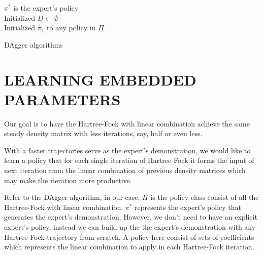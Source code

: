 \documentclass[twoside]{article}
\begin{document}
\begin{algorithm}[htb]
 $\pi^*$  is the expert’s policy \\
 Initialized $D \leftarrow \emptyset$ \\
 Initialized $\hat{\pi}_1$ to any policy in $\Pi$ \\
 \caption{DAgger algorithms}
\end{algorithm}



\section{LEARNING EMBEDDED PARAMETERS}

Our goal is to have the Hartree-Fock with linear combination achieve the same steady density matrix with less iterations, say, half or even less.  



% 

With a faster trajectories serve as the expert's demonstration, we would like to learn a policy that for each single iteration of Hartree-Fock it forms the input of next iteration from the linear combination of previous density matrices which may make the iteration more productive.   

Refer to the DAgger algorithm, in our case, $\Pi$ is the policy class consist of all the Hartree-Fock with linear combination. $\pi^*$ represents the expert's policy that generates the expert's demonstration. However, we don't need to have an explicit expert's policy, instead we can build up the the expert's demonstration with any Hartree-Fock trajectory from scratch. A policy here consist of sets of coefficients which represents the linear combination to apply in each Hartree-Fock iteration. 
\end{document}
